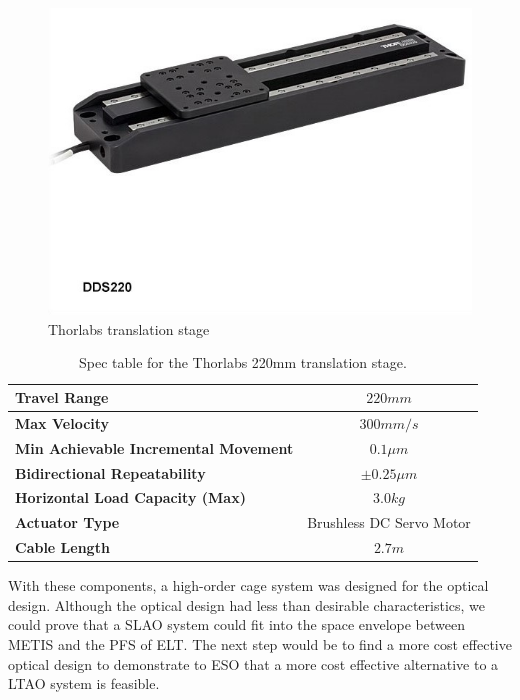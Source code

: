 \begin{figure}[h!]
\centering
\includegraphics[width=9 cm]{Figures/thor.jpg}
\caption{Thorlabs translation stage \cite{thor}}
\label{fig:thor}
\end{figure}


\begin{table}[h!]
\begin{tabular}{|l|c|}
\hline
\textbf{Travel Range}                        & $220mm$                  \\ \hline
\textbf{Max Velocity}                        & $300mm/s$                \\ \hline
\textbf{Min Achievable Incremental Movement} & $0.1 \mu m$              \\ \hline
\textbf{Bidirectional Repeatability}         & $\pm 0.25 \mu m$         \\ \hline
\textbf{Horizontal Load Capacity (Max)}      & $3.0 kg$                 \\ \hline
\textbf{Actuator Type}                       & Brushless DC Servo Motor \\ \hline
\textbf{Cable Length}                        & $2.7m$                   \\ \hline
\end{tabular}
\caption{Spec table for the Thorlabs 220mm translation stage. \cite{thor}}
\label{tab:thor}
\end{table}

With these components, a high-order cage system was designed for the optical design.
Although the optical design had less than desirable characteristics, we
could prove that a SLAO system could fit into the space envelope between METIS and
the PFS of ELT.  The next step would be to find a more cost effective optical design
to demonstrate to ESO that a more cost effective alternative to a LTAO system is
feasible.  



